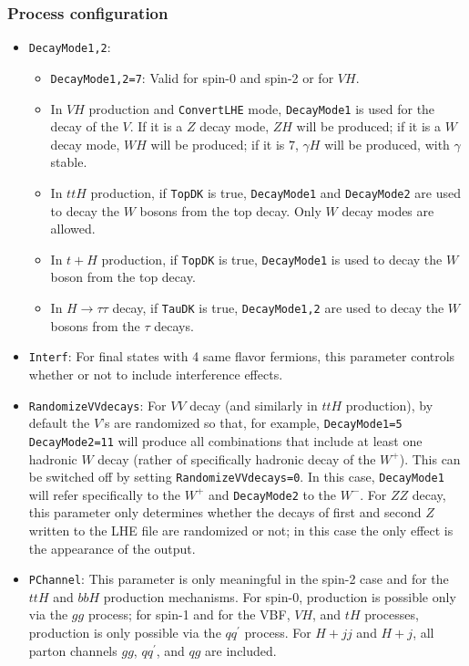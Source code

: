 \documentclass[aps,superscriptaddress,nofootinbib]{revtex4}
\begin{document}
\subsubsection{Process configuration}
\begin{itemize}
\item \verb|DecayMode1,2|:
\begin{itemize}
\item \verb|DecayMode1,2=7|: Valid for spin-0 and spin-2 or for $VH$.
\item In $VH$ production and \verb|ConvertLHE| mode, \verb|DecayMode1| is used for the decay of the $V$.  If it is a $Z$ decay mode, $ZH$ will be produced; if it is a $W$ decay mode, $WH$ will be produced; if it is $7$, $\gamma H$ will be produced, with $\gamma$ stable.
\item In $ttH$ production, if \verb|TopDK| is true, \verb|DecayMode1| and \verb|DecayMode2| are used to decay the $W$ bosons from the top decay.  Only $W$ decay modes are allowed.
\item In $t+H$ production, if \verb|TopDK| is true, \verb|DecayMode1| is used to decay the $W$ boson from the top decay.
\item In $H\to \tau\tau$ decay, if \verb|TauDK| is true, \verb|DecayMode1,2| are used to decay the $W$ bosons from the $\tau$ decays.
\end{itemize}
\item \verb|Interf|: For final states with 4 same flavor fermions, this parameter controls whether or not to include interference effects.
\item \verb|RandomizeVVdecays|: For $VV$ decay (and similarly in $ttH$ production), by default the $V$'s are randomized so that, for example, \verb|DecayMode1=5 DecayMode2=11| will produce all combinations that include at least one hadronic $W$ decay (rather of specifically hadronic decay of the $W^+$).  This can be switched off by setting \verb|RandomizeVVdecays=0|.  In this case, \verb|DecayMode1| will refer specifically to the $W^+$ and \verb|DecayMode2| to the $W^-$.  For $ZZ$ decay, this parameter only determines whether the decays of first and second $Z$ written to the LHE file are randomized or not; in this case the only effect is the appearance of the output.
\item \verb|PChannel|: This parameter is only meaningful in the spin-2 case and for the $ttH$ and $bbH$ production mechanisms.  For spin-0, production is possible only via the $gg$ process; for spin-1 and for the VBF, $VH$, and $tH$ processes, production is only possible via the $qq^\prime$ process.  For $H+jj$ and $H+j$, all parton channels $gg$, $qq^\prime$, and $qg$ are included.

\end{itemize}
\end{document}
